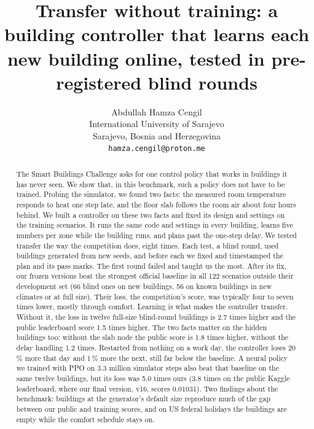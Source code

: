 \documentclass{article}
\title{Transfer without training: a building controller that learns each new building online, tested in
pre-registered blind rounds}
\author{%
  Abdullah Hamza Cengil\\
  International University of Sarajevo\\
  Sarajevo, Bosnia and Herzegovina\\
  \texttt{hamza.cengil@proton.me}
}
\begin{document}
\maketitle

\begin{abstract}
The Smart Buildings Challenge asks for one control policy that works in buildings it has never seen. We show that, in
this benchmark, such a policy does not have to be trained. Probing the simulator, we found two facts: the measured room
temperature responds to heat one step late, and the floor slab follows the room air about four hours behind. We built a
controller on these two facts and fixed its design and settings on the training scenarios. It runs the same
code and settings in every building, learns five numbers per zone while the building runs, and plans past the one-step
delay. We tested transfer the way the competition does, eight times. Each test, a blind round, used buildings generated
from new seeds, and before each we fixed and timestamped the plan and its pass marks. The first round failed and taught
us the most. After its fix, our frozen versions beat the strongest official baseline in all 122 scenarios outside their
development set (66 blind ones on new buildings, 56 on known buildings in new climates or at full size). Their loss, the
competition's score, was typically four to seven times lower, mostly through comfort. Learning is what makes the
controller transfer. Without
it, the loss in twelve full-size blind-round buildings is 2.7 times higher and the public leaderboard score 1.5 times
higher. The two facts matter on the hidden buildings
too: without the slab node the public score is 1.8 times higher, without the delay handling 1.2 times. Restarted from
nothing on a work day, the controller loses 20\,\% more that day and 1\,\% more the next, still far below the
baseline. A neural policy we trained with PPO on 3.3 million simulator steps also beat that baseline on the same
twelve buildings, but its loss was 5.0 times ours (3.8 times on the public Kaggle leaderboard, where our final
version, v16, scores 0.01031). Two findings about the benchmark: buildings at the generator's default size reproduce much
of the gap between our public and training scores, and on US federal holidays the buildings are empty while
the comfort schedule stays on.
\end{abstract}
\end{document}
